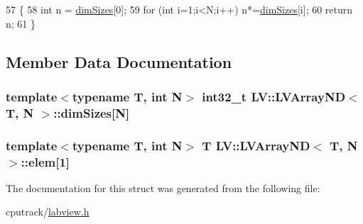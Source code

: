 \begin{DoxyCode}
57                   \{ 
58         \textcolor{keywordtype}{int} n = \hyperlink{struct_l_v_1_1_l_v_array_n_d_af0f193dfa98a07a26740224c52a4dfcc}{dimSizes}[0];
59         \textcolor{keywordflow}{for} (\textcolor{keywordtype}{int} i=1;i<N;i++) n*=\hyperlink{struct_l_v_1_1_l_v_array_n_d_af0f193dfa98a07a26740224c52a4dfcc}{dimSizes}[i];
60         \textcolor{keywordflow}{return} n; 
61     \}
\end{DoxyCode}


\subsection{Member Data Documentation}
\subsubsection[{\texorpdfstring{dim\+Sizes}{dimSizes}}]{\setlength{\rightskip}{0pt plus 5cm}template$<$typename T, int N$>$ int32\+\_\+t {\bf L\+V\+::\+L\+V\+Array\+ND}$<$ T, N $>$\+::dim\+Sizes\mbox{[}N\mbox{]}}\hypertarget{struct_l_v_1_1_l_v_array_n_d_af0f193dfa98a07a26740224c52a4dfcc}{}\label{struct_l_v_1_1_l_v_array_n_d_af0f193dfa98a07a26740224c52a4dfcc}
\subsubsection[{\texorpdfstring{elem}{elem}}]{\setlength{\rightskip}{0pt plus 5cm}template$<$typename T, int N$>$ T {\bf L\+V\+::\+L\+V\+Array\+ND}$<$ T, N $>$\+::elem\mbox{[}1\mbox{]}}\hypertarget{struct_l_v_1_1_l_v_array_n_d_ac92866a39886f3f2d947536f74ac8210}{}\label{struct_l_v_1_1_l_v_array_n_d_ac92866a39886f3f2d947536f74ac8210}


The documentation for this struct was generated from the following file\+:\begin{DoxyCompactItemize}
\item 
cputrack/\hyperlink{labview_8h}{labview.\+h}\end{DoxyCompactItemize}
